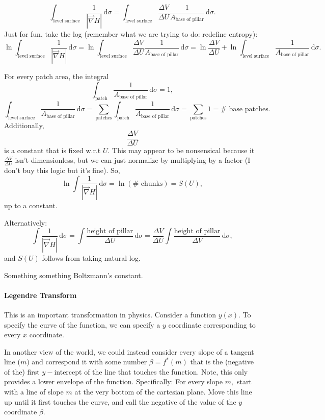 \documentclass[12pt]{article}
\theoremstyle{remark}
\newcommand{\diffn}[1]{\,\mathrm{d}{#1}}
\begin{document}
\[\int_{\text{level surface}}\frac{1}{|\vec\nabla H|}\diffn{\sigma}=\int_{\text{level surface}}\frac{\Delta V}{\Delta U}\frac{1}{A_{\text{base of pillar}}}\diffn{\sigma}.\]
Just for fun, take the log (remember what we are trying to do: redefine entropy):
\[\ln\int_{\text{level surface}}\frac{1}{|\vec\nabla H|}\diffn{\sigma}=\ln\int_{\text{level surface}}\frac{\Delta V}{\Delta U}\frac{1}{A_{\text{base of pillar}}}\diffn{\sigma}=\ln\frac{\Delta V}{\Delta U}+\ln\int_{\text{level surface}}\frac{1}{A_{\text{base of pillar}}}\diffn{\sigma}.\]

For every patch area, the integral
\[\int_{\text{patch}}\frac{1}{A_{\text{base of pillar}}}\diffn{\sigma}=1,\]
\[\int_{\text{level surface}}\frac{1}{A_{\text{base of pillar}}}\diffn{\sigma}=\sum_{\text{patches}}\int_{\text{patch}}\frac{1}{A_{\text{base of pillar}}}\diffn{\sigma}=\sum_{\text{patches}}1=\# \text{ base patches}.\]
Additionally,
\[\frac{\Delta V}{\Delta U}\] is a constant that is fixed w.r.t $U.$ This may appear to be nonsensical because it $\frac{\Delta V}{\Delta U}$ isn't dimensionless, but we can just normalize by multiplying by a factor (I don't buy this logic but it's fine). So,
\[\ln\int\frac{1}{|\vec\nabla H|}\diffn{\sigma}=\ln(\# \text{ chunks})=S(U),\] up to a constant.

Alternatively:
\[\int\frac{1}{|\vec\nabla H|}\diffn{\sigma}=\int\frac{\text{height of pillar}}{\Delta U}\diffn{\sigma}=\frac{\Delta V}{\Delta U}\int\frac{\text{height of pillar}}{\Delta V}\diffn{\sigma},\] and $S(U)$ follows from taking natural log.

Something something Boltzmann's constant.


\paragraph{Legendre Transform}
This is an important transformation in physics. Consider a function $y(x).$ To specify the curve of the function, we can specify a $y$ coordinate corresponding to every $x$ coordinate.

In another view of the world, we could instead consider every slope of a tangent line ($m$) and correspond it with some number $\beta =f^\ast(m)$ that is the (negative of the) first $y-$intercept of the line that touches the function. Note, this only provides a lower envelope of the function. Specifically:
For every slope $m,$ start with a line of slope $m$ at the very bottom of the cartesian plane. Move this line up until it first touches the curve, and call the negative of the value of the $y$ coordinate $\beta.$
\end{document}
